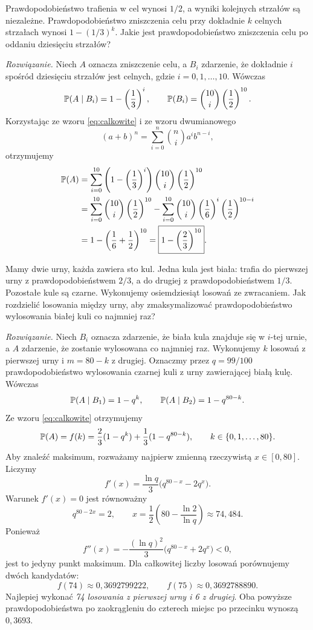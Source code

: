 \begin{przyklad}
\label{przykl:strzaly}
Prawdopodobieństwo trafienia w cel wynosi $1/2$, a wyniki kolejnych
strzałów są niezależne. Prawdopodobieństwo zniszczenia celu przy
dokładnie $k$ celnych strzałach wynosi $1-(1/3)^k$.
Jakie jest prawdopodobieństwo zniszczenia celu po oddaniu dziesięciu strzałów?
\end{przyklad}

\noindent\emph{Rozwiązanie.}
Niech $A$ oznacza zniszczenie celu, a $B_i$ zdarzenie, że dokładnie
$i$ spośród dziesięciu strzałów jest celnych, gdzie $i=0,1,\ldots,10$.
Wówczas
\[
  \mathbb{P}(A\mid B_i)=1-\left(\frac13\right)^i,
  \qquad
  \mathbb{P}(B_i)=\binom{10}{i}\left(\frac12\right)^{10}.
\]
Korzystając ze wzoru \eqref{eq:calkowite} i ze wzoru dwumianowego
\[
  (a+b)^n=\sum_{i=0}^{n}\binom{n}{i}a^ib^{n-i},
\]
otrzymujemy
\begin{align*}
  \mathbb{P}(A)
    &=\sum_{i=0}^{10}\left(1-\left(\frac13\right)^i\right)
        \binom{10}{i}\left(\frac12\right)^{10}\\
    &=\sum_{i=0}^{10}\binom{10}{i}\left(\frac12\right)^{10}
      -\sum_{i=0}^{10}\binom{10}{i}
        \left(\frac16\right)^i\left(\frac12\right)^{10-i}\\
    &=1-\left(\frac16+\frac12\right)^{10}
      =\boxed{1-\left(\frac23\right)^{10}}.
\end{align*}

\begin{przyklad}
\label{przykl:urny}
Mamy dwie urny, każda zawiera sto kul. Jedna kula jest biała:
trafia do pierwszej urny z prawdopodobieństwem $2/3$, a do drugiej
z prawdopodobieństwem $1/3$. Pozostałe kule są czarne.
Wykonujemy osiemdziesiąt losowań ze zwracaniem.
Jak rozdzielić losowania między urny, aby zmaksymalizować
prawdopodobieństwo wylosowania białej kuli co najmniej raz?
\end{przyklad}

\noindent\emph{Rozwiązanie.}
Niech $B_i$ oznacza zdarzenie, że biała kula znajduje się w $i$-tej urnie,
a $A$ zdarzenie, że zostanie wylosowana co najmniej raz.
Wykonujemy $k$ losowań z pierwszej urny i $m=80-k$ z drugiej.
Oznaczmy przez $q=99/100$ prawdopodobieństwo wylosowania czarnej kuli
z urny zawierającej białą kulę. Wówczas
\[
  \mathbb{P}(A\mid B_1)=1-q^k,
  \qquad
  \mathbb{P}(A\mid B_2)=1-q^{80-k}.
\]
Ze wzoru \eqref{eq:calkowite} otrzymujemy
\begin{equation}
  \mathbb{P}(A)=f(k)=\frac23(1-q^k)+\frac13(1-q^{80-k}),
  \qquad k\in\{0,1,\ldots,80\}.
  \label{eq:urny-funkcja}
\end{equation}
Aby znaleźć maksimum, rozważamy najpierw zmienną rzeczywistą $x\in[0,80]$.
Liczymy
\[
  f'(x)=\frac{\ln q}{3}\bigl(q^{80-x}-2q^x\bigr).
\]
Warunek $f'(x)=0$ jest równoważny
\[
  q^{80-2x}=2,
  \qquad
  x=\frac12\left(80-\frac{\ln2}{\ln q}\right)\approx74{,}484.
\]
Ponieważ
\[
  f''(x)=-\frac{(\ln q)^2}{3}\bigl(q^{80-x}+2q^x\bigr)<0,
\]
jest to jedyny punkt maksimum. Dla całkowitej liczby losowań
porównujemy dwóch kandydatów:
\[
  f(74)\approx0{,}3692799222,
  \qquad f(75)\approx0{,}3692788890.
\]
Najlepiej wykonać \emph{74 losowania z pierwszej urny i 6 z drugiej}.
Oba powyższe prawdopodobieństwa po zaokrągleniu do czterech miejsc
po przecinku wynoszą $0{,}3693$.

